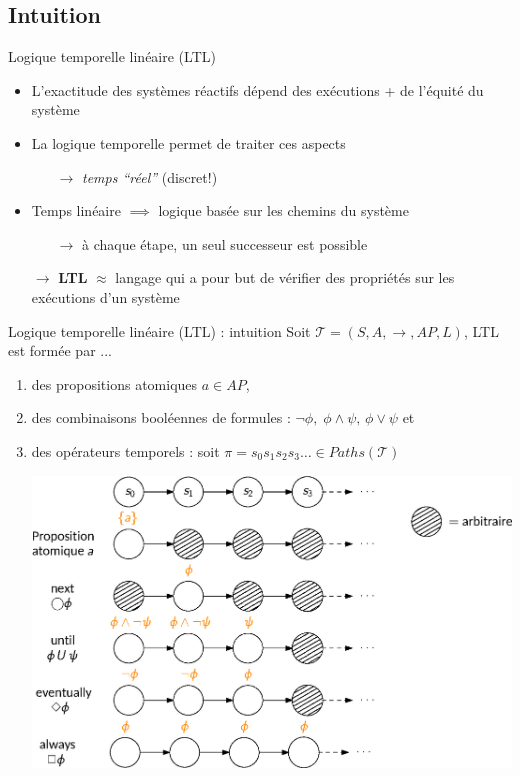 \documentclass[compress]{beamer}
\begin{document}
\subsection{Intuition}
\begin{frame}{Logique temporelle linéaire (LTL)}
\begin{itemize}
  \item L'exactitude des systèmes réactifs dépend des exécutions + de l'équité du système
  \item La logique {\color{fibeamer@orange}temporelle} permet de traiter ces aspects
  \begin{itemize}
    \item[$\rightarrow$] \textit{temps ``réel''} (discret!)
  \end{itemize}
  \item Temps linéaire $\implies$ logique basée sur les {\color{fibeamer@orange}chemins du système}
    \begin{itemize}
      \item[$\rightarrow$] \`a chaque étape, un seul successeur est possible
    \end{itemize}
    \item[$\rightarrow$] \textbf{\color{fibeamer@orange}LTL} $\approx$ langage qui a pour but de vérifier des propriétés sur les exécutions d'un système%
\end{itemize}
\end{frame}

\begin{frame}{Logique temporelle linéaire (LTL) : intuition}
  \vspace{-0.04\linewidth}
  \footnotesize
  Soit $\mathcal{T} = (S, A, \rightarrow, AP, L)$,
  LTL est formée par ...
  \begin{enumerate}
    \item des propositions atomiques $a \in AP$,
    \item des combinaisons booléennes de formules :
    $
      \neg \phi, \; \phi \wedge \psi, \, \phi \vee \psi
    $
     et
    \item des opérateurs temporels : soit $\pi = s_0s_1s_2s_3\dots \in Paths(\mathcal{T})$
    \begin{center}
      \includegraphics[width=0.8\linewidth]{resources/LTL}
    \end{center}
  \end{enumerate}
\end{frame}
\end{document}
